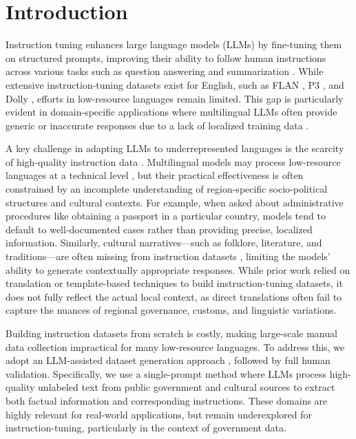 \section{Introduction}


Instruction tuning enhances large language models (LLMs) by fine-tuning them on structured prompts, improving their ability to follow human instructions across various tasks such as question answering and summarization \cite{ouyang2022instructgpt}. While extensive instruction-tuning datasets exist for English, such as FLAN \cite{longpre2023flan}, P3 \cite{sanh2021multitask}, and Dolly \cite{conover2023dolly}, efforts in low-resource languages remain limited. This gap is particularly evident in domain-specific applications where multilingual LLMs often provide generic or inaccurate responses due to a lack of localized training data \cite{li2023bactrian}.


A key challenge in adapting LLMs to underrepresented languages is the scarcity of high-quality instruction data \cite{li2023bactrian}. Multilingual models may process low-resource languages at a technical level \cite{openai2024gpt4o}, but their practical effectiveness is often constrained by an incomplete understanding of region-specific socio-political structures and cultural contexts. For example, when asked about administrative procedures like obtaining a passport in a particular country, models tend to default to well-documented cases rather than providing precise, localized information. Similarly, cultural narratives—such as folklore, literature, and traditions—are often missing from instruction datasets \cite{conover2023dolly}, limiting the models’ ability to generate contextually appropriate responses. While prior work relied on translation \cite{sengupta2023jais} or template-based techniques \cite{cahyawijaya-etal-2024-cendol} to build instruction-tuning datasets, it does not fully reflect the actual local context, as direct translations often fail to capture the nuances of regional governance, customs, and linguistic variations.

Building instruction datasets from scratch is costly, making large-scale manual data collection impractical for many low-resource languages. To address this, we adopt an LLM-assisted dataset generation approach \cite{liu-etal-2022-wanli,cahyawijaya2023instructalign,zhang-etal-2024-llm-assisted}, followed by full human validation. Specifically, we use a single-prompt method where LLMs process high-quality unlabeled text from public government and cultural sources to extract both factual information and corresponding instructions. These domains are highly relevant for real-world applications, but remain underexplored for instruction-tuning, particularly in the context of government data.


